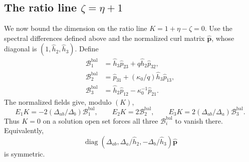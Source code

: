 \documentclass[11pt,a4paper]{article}
\numberwithin{equation}{section}
\theoremstyle{plain}
\theoremstyle{definition}
\theoremstyle{remark}
\begin{document}
\subsection{The ratio line \texorpdfstring{$\zeta =\eta +1$}{ζ = η + 1}}
\label{r3:balancedline}
We now bound the dimension on the ratio line $K=1+\eta-\zeta=0$. Use the spectral differences defined above and the normalized curl
matrix $\widehat{\boldsymbol p}$, whose diagonal is $(1,\widehat h_2,\widehat h_3)$.
Define
\[
 \begin{aligned}
 \mathcal B_1^{\mathrm{bal}}&=\widehat h_3\widehat p_{23}+q\widehat h_2\widehat p_{32},\\
 \mathcal B_2^{\mathrm{bal}}&=\widehat p_{31}+(\kappa_0/q)\widehat h_3\widehat p_{13},\\
 \mathcal B_3^{\mathrm{bal}}&=\widehat h_2\widehat p_{12}-\kappa_0^{-1}\widehat p_{21}.
 \end{aligned}
\]
The normalized fields give, modulo $(K)$,
\[
 E_1K=-2(\Delta_{ab}/\Delta_b)\mathcal B_1^{\mathrm{bal}},\qquad
 E_2K=2\mathcal B_2^{\mathrm{bal}},\qquad
 E_3K=2(\Delta_{ab}/\Delta_a)\mathcal B_3^{\mathrm{bal}}.
\]
Thus $K=0$ on a solution open set forces all three $\mathcal B_i^{\mathrm{bal}}$ to vanish there.
Equivalently,
\[
 \operatorname{diag}(\Delta_{ab},\Delta_a/\widehat h_2 ,-\Delta_b/\widehat h_3 )\widehat{\boldsymbol p}
\]
is symmetric.
\end{document}
